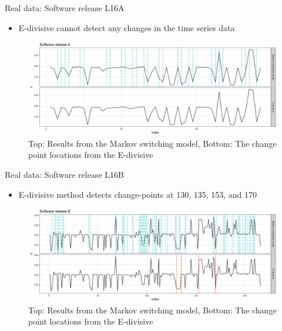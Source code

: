 \documentclass{beamer}
\begin{document}
\begin{frame}
Real data: Software release L16A

\begin{itemize}
\item E-divisive cannot detect any changes in the time series data
\end{itemize}

\begin{figure}
\includegraphics[width=1\linewidth]{compare_L16A}
\caption{Top: Results from the Markov switching model, Bottom: The change point locations from the E-divisive}
\end{figure}

\end{frame}
\begin{frame}
Real data: Software release L16B

\begin{itemize}
\item E-divisive method detects change-points at 130, 135, 153, and 170
\end{itemize}

\begin{figure}
\includegraphics[width=1\linewidth]{compare_L16B}
\caption{Top: Results from the Markov switching model, Bottom: The change point locations from the E-divisive}
\end{figure}

\end{frame}
\end{document}
